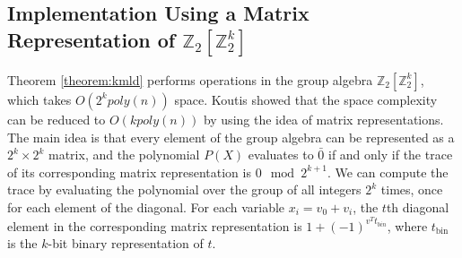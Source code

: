 

\subsection{Implementation Using a Matrix Representation of $\mathbb{Z}_2[\mathbb{Z}_2^k]$}
Theorem \ref{theorem:kmld} performs operations in the group algebra $\mathbb{Z}_2[\mathbb{Z}_2^k]$,
which takes $O(2^k poly(n))$ space. Koutis \cite{koutis:icalp08} showed that the space complexity can be reduced to $O(k poly(n))$ by using the idea of matrix representations.
%
The main idea is that every element of the group algebra can be represented as a $2^{k}\times2^k$ matrix, and the polynomial $P(X)$ evaluates to $\bar 0$ if and only if the trace of its corresponding matrix representation is $0 \mod 2^{k+1}$. We can compute the trace by evaluating the polynomial over the group of all integers $2^k$ times, once for each element of the diagonal. For each variable $x_i = v_0 + v_i$, the $t$th diagonal element in the corresponding matrix representation is $1+(-1)^{v^T t_{bin}}$, where $t_{\text{bin}}$ is the $k$-bit binary representation of $t$.

